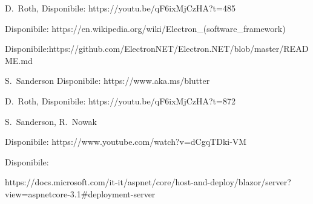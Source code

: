 \begin{thebibliography}{999}
D.~Roth,
Disponibile:
https://youtu.be/qF6ixMjCzHA?t=485

Disponibile:\linebreak
https://en.wikipedia.org/wiki/Electron\_(software\_framework)

Disponibile:\linebreak https://github.com/ElectronNET/Electron.NET/blob\linebreak/master/README.md

S.~Sanderson
Disponibile: https://www.aka.ms/blutter

D.~Roth,
Disponibile: https://youtu.be/qF6ixMjCzHA?t=872

S.~Sanderson, R.~Nowak

Disponibile: https://www.youtube.com/watch?v=dCgqTDki-VM

Disponibile:

https://docs.microsoft.com/it-it/aspnet/core/host-and-deploy/blazor/server?view=aspnetcore-3.1\#deployment-server


%
%
%
%
%
%
%


\end{thebibliography}
